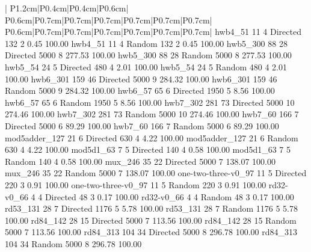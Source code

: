 \documentclass[conference]{IEEEtran}
\begin{document}
\begin{table}[!t]
\begin{tabular}{|
P{1.2cm}|P{0.4cm}|P{0.4cm}|P{0.6cm}|
P{0.6cm}|P{0.7cm}|P{0.7cm}|P{0.7cm}|P{0.7cm}|P{0.7cm}|P{0.7cm}|
P{0.6cm}|P{0.7cm}|P{0.7cm}|P{0.7cm}|P{0.7cm}|P{0.7cm}|P{0.7cm}|
}
hwb4_51	11	4	Directed	132	2	0.45	100.00%
hwb4_51	11	4	Random	132	2	0.45	100.00%
hwb5_300	88	28	Directed	5000	8	277.53	100.00%
hwb5_300	88	28	Random	5000	8	277.53	100.00%
hwb5_54	24	5	Directed	480	4	2.01	100.00%
hwb5_54	24	5	Random	480	4	2.01	100.00%
hwb6_301	159	46	Directed	5000	9	284.32	100.00%
hwb6_301	159	46	Random	5000	9	284.32	100.00%
hwb6_57	65	6	Directed	1950	5	8.56	100.00%
hwb6_57	65	6	Random	1950	5	8.56	100.00%
hwb7_302	281	73	Directed	5000	10	274.46	100.00%
hwb7_302	281	73	Random	5000	10	274.46	100.00%
hwb7_60	166	7	Directed	5000	6	89.29	100.00%
hwb7_60	166	7	Random	5000	6	89.29	100.00%
mod5adder_127	21	6	Directed	630	4	4.22	100.00%
mod5adder_127	21	6	Random	630	4	4.22	100.00%
mod5d1_63	7	5	Directed	140	4	0.58	100.00%
mod5d1_63	7	5	Random	140	4	0.58	100.00%
mux_246	35	22	Directed	5000	7	138.07	100.00%
mux_246	35	22	Random	5000	7	138.07	100.00%
one-two-three-v0_97	11	5	Directed	220	3	0.91	100.00%
one-two-three-v0_97	11	5	Random	220	3	0.91	100.00%
rd32-v0_66	4	4	Directed	48	3	0.17	100.00%
rd32-v0_66	4	4	Random	48	3	0.17	100.00%
rd53_131	28	7	Directed	1176	5	5.78	100.00%
rd53_131	28	7	Random	1176	5	5.78	100.00%
rd84_142	28	15	Directed	5000	7	113.56	100.00%
rd84_142	28	15	Random	5000	7	113.56	100.00%
rd84_313	104	34	Directed	5000	8	296.78	100.00%
rd84_313	104	34	Random	5000	8	296.78	100.00%

\end{tabular}
\end{table}
\end{document}
